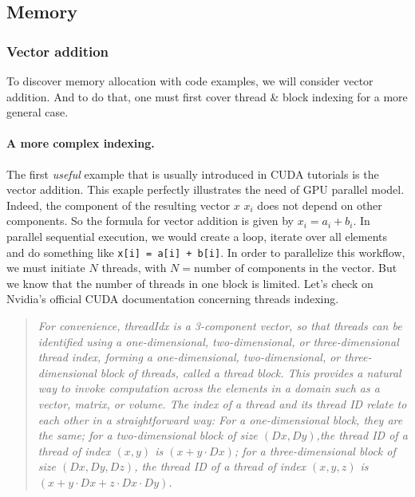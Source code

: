 \documentclass[12pt]{article}
\begin{document}
\subsection{Memory}

\subsubsection{Vector addition}
To discover memory allocation with code examples, we will consider vector addition. And to do that, 
one must first cover thread \& block indexing for a more general case.
\paragraph{A more complex indexing.} The first \textit{useful} example 
that is usually introduced in CUDA tutorials is the vector addition. This exaple
perfectly illustrates the need of GPU parallel model. Indeed, the component of the resulting
 vector $x$ $x_i$ does not depend on other components. So the formula for vector addition is given by 
 $x_i = a_i + b_i$. In parallel sequential execution, we would create a loop, iterate over all elements and 
do something like \verb|x[i] = a[i] + b[i]|. In order to parallelize this workflow, we must initiate $N$ 
threads, with $N = \text{number of components in the vector}$. But we know that the number of threads in one 
block is limited. Let's check on Nvidia's official CUDA documentation \cite{center} concerning threads indexing. 
\begin{quote}
   \textsl{For convenience, {\selectfont threadIdx} is a 3-component vector, 
   so that threads can be identified using a one-dimensional, 
   two-dimensional, or three-dimensional thread index, forming a one-dimensional, two-dimensional, 
   or three-dimensional block of threads, called a thread block. This provides a natural way to invoke computation across 
   the elements in a domain such as a vector, matrix, or volume.
   The index of a thread and its thread ID relate to each other 
   in a straightforward way: For a one-dimensional block, they are the same; for 
   a two-dimensional block of size $(Dx, Dy)$,the thread ID of a thread 
   of index $(x, y)$ is $(x + y\cdot Dx)$; for a three-dimensional block of size $(Dx, Dy, Dz)$, the thread ID of a 
   thread of index $(x, y, z)$ is $(x + y\cdot Dx + z\cdot Dx\cdot Dy)$.}
\end{quote}
\end{document}
